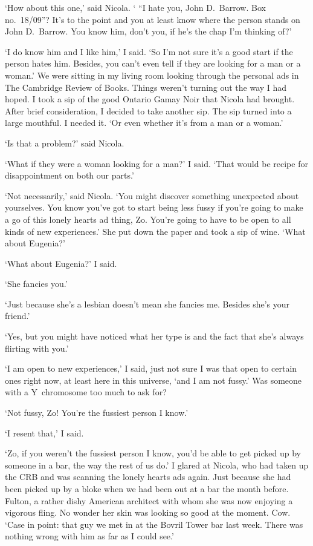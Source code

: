 
\twelverm
`How about this one,' said Nicola. ` ``I hate you, John D.~Barrow.
Box no.~18/09''? It's to the point and you at least know where the
person stands on John D.~Barrow. You know him, don't you, if he's
the chap I'm thinking of?'

`I do know him and I like him,' I said. `So I'm not sure it's a good start if the person hates him. Besides, you can't
even tell if they are looking for a man or a woman.' We were sitting
in my living room looking through the personal ads in {\twelvesl The
Cambridge Review of Books}.  Things weren't turning out the way I
had hoped. I took a sip of the good Ontario Gamay
Noir that Nicola had brought. After brief consideration, I decided to take another sip.
The sip turned into a large mouthful. I needed it. `Or even whether it's from a man or a woman.'

`Is that a problem?' said Nicola.

`What if they were a woman looking for a man?' I said. `That would be
recipe for disappointment on both our parts.'

`Not necessarily,' said Nicola. `You might discover something
unexpected about yourselves. You know you've got to start being less fussy if
you're going to make a go of this lonely hearts ad thing, Zo. You're going to have to be
open to all kinds of new experiences.' She put down the paper and took a sip of wine. `What about Eugenia?'

`What about Eugenia?' I said.

`She fancies you.'

`Just because she's a lesbian doesn't mean she fancies me. Besides she's your friend.'

`Yes, but you might have noticed what her type is and the fact that she's always flirting with you.'

`I am open to new experiences,' I said, just not sure I was that open to certain ones right now, at least here in this universe, `and I am not
fussy.' Was someone with a Y~chromosome too much to ask for?

`Not fussy, Zo! You're the fussiest person I know.'

`I resent that,' I said.

`Zo, if you weren't the fussiest person I know, you'd be able
to get picked up by someone in a bar, the way the rest of us do.' I glared at
Nicola, who had taken up the {\twelvesl CRB\/} and was scanning the lonely hearts ads again. Just because she had been picked up by a bloke when we had been out at a bar
the month before. Fulton, a rather dishy American architect with whom she
was now enjoying a vigorous fling. No wonder her skin was looking so
good at the moment. Cow. `Case in point: that guy we met in at the
Bovril Tower bar last week. There was nothing wrong with him as far
as I could see.'

